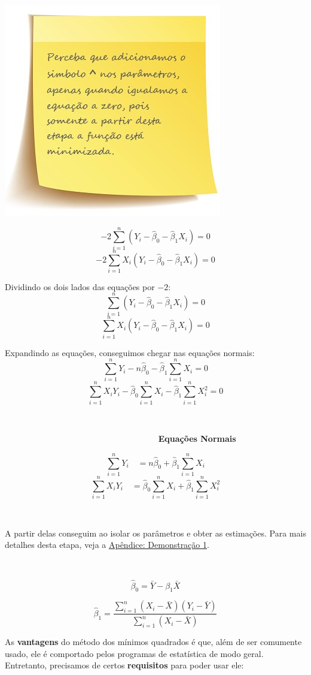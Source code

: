 \documentclass[
]{article}
\begin{document}
\includegraphics{images/note1.jpg}

\[-2\sum_{i=1}^{n}(Y_i-\hat{\beta}_0-\hat{\beta}_1X_i)=0\]
\[-2\sum_{i=1}^{n}X_i(Y_i-\hat{\beta}_0-\hat{\beta}_1X_i)=0\]

Dividindo os dois lados das equações por \(-2\):
\[\sum_{i=1}^{n}(Y_i-\hat{\beta}_0-\hat{\beta}_1X_i)=0\]
\[\sum_{i=1}^{n}X_i(Y_i-\hat{\beta}_0-\hat{\beta}_1X_i)=0\]

Expandindo as equações, conseguimos chegar nas equações normais:
\[\sum_{i=1}^{n}Y_i-n\hat{\beta}_0-\hat{\beta}_1\sum_{i=1}^{n}X_i=0\]
\[\sum_{i=1}^{n}X_iY_i-\hat{\beta}_0\sum_{i=1}^{n}X_i-\hat{\beta}_1\sum_{i=1}^{n}X_i^2=0\]

~

\(\qquad\qquad\qquad\qquad\qquad\qquad\qquad\qquad\qquad\)
\textbf{Equações Normais}

\[\sum_{i=1}^{n}Y_i\quad=n\hat{\beta}_0+\hat{\beta}_1\sum_{i=1}^{n}X_i\]
\[\sum_{i=1}^{n}X_iY_i\quad=\hat{\beta}_0\sum_{i=1}^{n}X_i+\hat{\beta}_1\sum_{i=1}^{n}X_i^2\]

~

A partir delas conseguim ao isolar os parâmetros e obter as estimações.
Para mais detalhes desta etapa, veja a
\href{https://larissars.github.io/Apostilas-estatistica/apendice.html\#Demonstração_1}{Apêndice:
Demonstração 1}.

~

\[\hat{\beta}_0=\bar{Y}-\beta_1\bar{X}\]

\[\hat{\beta}_1 = \frac{\sum_{i=1}^{n}(X_i-\bar{X})(Y_i-\bar{Y})}{\sum_{i=1}^{n}(X_i-\bar{X})}\]

As \textbf{vantagens} do método dos mínimos quadrados é que, além de ser
comumente usado, ele é comportado pelos programas de estatística de modo
geral.\\
Entretanto, precisamos de certos \textbf{requisitos} para poder usar
ele:
\end{document}
